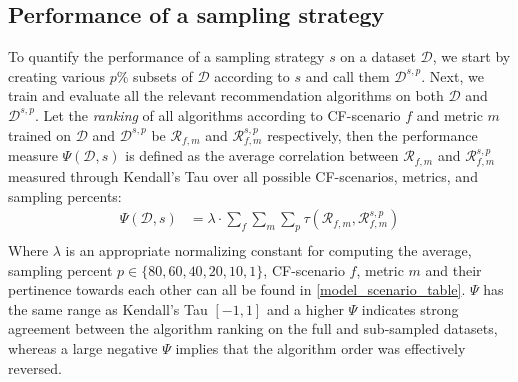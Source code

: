 \subsection{Performance of a sampling strategy} \label{sampling_perf}
To quantify the performance of a sampling strategy $s$ on a dataset $\mathcal{D}$, we start by creating various $p\%$ subsets of $\mathcal{D}$ according to $s$ and call them $\mathcal{D}^{s, p}$. Next, we train and evaluate all the relevant recommendation algorithms on both $\mathcal{D}$ and $\mathcal{D}^{s, p}$. Let the \emph{ranking} of all algorithms according to CF-scenario $f$ and metric $m$ trained on $\mathcal{D}$ and $\mathcal{D}^{s, p}$ be $\mathcal{R}_{f, m}$ and $\mathcal{R}^{s, p}_{f, m}$ respectively, then the performance measure $\Psi(\mathcal{D}, s)$ is defined as the average correlation between $\mathcal{R}_{f, m}$ and $\mathcal{R}^{s, p}_{f, m}$ measured through Kendall's Tau over all possible CF-scenarios, metrics, and sampling percents:
\begin{equation*}
\begin{split}
    \Psi\left(\mathcal{D}, s\right) &= \lambda \cdot \sum_{f} \sum_{m} \sum_{p} \tau\left(\mathcal{R}_{f, m}, \mathcal{R}^{s, p}_{f, m}\right) \\
\end{split}
\end{equation*}
Where $\lambda$ is an appropriate normalizing constant for computing the average, sampling percent $p \in \{ 80, 60, 40, 20, 10, 1 \}$, CF-scenario $f$, metric $m$ and their pertinence towards each other can all be found in \cref{model_scenario_table}. $\Psi$ has the same range as Kendall's Tau \ie $[-1, 1]$ and a higher $\Psi$ indicates strong agreement between the algorithm ranking on the full and sub-sampled datasets, whereas a large negative $\Psi$ implies that the algorithm order was effectively reversed.


